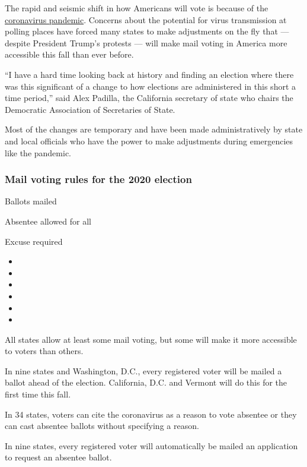 The rapid and seismic shift in how Americans will vote is because of the
\href{https://www.nytimes3xbfgragh.onion/interactive/2020/us/coronavirus-us-cases.html}{coronavirus
pandemic}. Concerns about the potential for virus transmission at
polling places have forced many states to make adjustments on the fly
that --- despite President Trump's protests --- will make mail voting in
America more accessible this fall than ever before.

``I have a hard time looking back at history and finding an election
where there was this significant of a change to how elections are
administered in this short a time period,'' said Alex Padilla, the
California secretary of state who chairs the Democratic Association of
Secretaries of State.

Most of the changes are temporary and have been made administratively by
state and local officials who have the power to make adjustments during
emergencies like the pandemic.

\hypertarget{mail-voting-rules-for-the-2020-election}{%
\subsubsection{Mail voting rules for the 2020
election}\label{mail-voting-rules-for-the-2020-election}}

 Ballots mailed

 Absentee allowed for all

 Excuse required

\begin{itemize}
\item
\item
\item
\item
\item
\item
\end{itemize}

All states allow at least some mail voting, but some will make it more
accessible to voters than others.

In nine states and Washington, D.C., every registered voter will be
mailed a ballot ahead of the election. California, D.C. and Vermont will
do this for the first time this fall.

In 34 states, voters can cite the coronavirus as a reason to vote
absentee or they can cast absentee ballots without specifying a reason.

In nine states, every registered voter will automatically be mailed an
application to request an absentee ballot.

